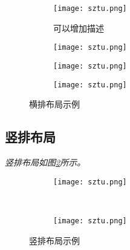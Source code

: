 \begin{figure}[!htb]
    \centering
    \begin{subfigure}[t]{0.24\linewidth}
        \begin{minipage}[b]{1\linewidth}
        \texttt{[image: sztu.png]}
        \caption{可以增加描述}
        \end{minipage}
    \end{subfigure}
    \begin{subfigure}[t]{0.24\linewidth}
        \begin{minipage}[b]{1\linewidth}
        \texttt{[image: sztu.png]}
        \caption{}
        \end{minipage}
    \end{subfigure}
    \begin{subfigure}[t]{0.24\linewidth}
        \begin{minipage}[b]{1\linewidth}
        \texttt{[image: sztu.png]}
        \caption{}
        \end{minipage}
    \end{subfigure}
    \begin{subfigure}[t]{0.24\linewidth}
        \begin{minipage}[b]{1\linewidth}
        \texttt{[image: sztu.png]}
        \caption{}
        \end{minipage}
    \end{subfigure}
    \caption{横排布局示例}
    \label{F.sztu_row}
\end{figure}

\lipsum

\subsection{竖排布局}
\emph{竖排布局如图\ref{F.sztu_col}所示。}

\begin{figure}[!htb]
    \centering
    \begin{subfigure}[t]{0.15\linewidth}
        \begin{minipage}[b]{1\linewidth}
        \texttt{[image: sztu.png]}
        \caption{}
        \end{minipage}
    \end{subfigure}\\
    \begin{subfigure}[t]{0.15\linewidth}
        \begin{minipage}[b]{1\linewidth}
        \texttt{[image: sztu.png]}
        \caption{}
        \end{minipage}
    \end{subfigure}
    \caption{竖排布局示例}
    \label{F.sztu_col}
\end{figure}

